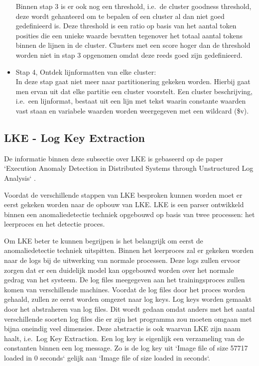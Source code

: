 \begin{itemize}
    Binnen stap 3 is er ook nog een threshold, i.e.\ de cluster goodness threshold, deze wordt gehanteerd om te bepalen of een cluster al dan niet goed gedefinieerd is. Deze threshold is een ratio op basis van het aantal token posities die een unieke waarde bevatten tegenover het totaal aantal tokens binnen de lijnen in de cluster. Clusters met een score hoger dan de threshold worden niet in stap 3 opgenomen omdat deze reeds goed zijn gedefinieerd.\\
    \item Stap 4, Ontdek lijnformatten van elke cluster:\\
    In deze stap gaat niet meer naar partitionering gekeken worden. Hierbij gaat men ervan uit dat elke partitie een cluster voorstelt. Een cluster beschrijving, i.e.\ een lijnformat, bestaat uit een lijn met tekst waarin constante waarden vast staan en variabele waarden worden weergegeven met een wildcard (\$v).
\end{itemize}

\subsection{LKE - Log Key Extraction}
De informatie binnen deze subsectie over LKE is gebaseerd op de paper `Execution Anomaly Detection in Distributed Systems through Unstructured Log Analysis` \autocite{fu2009execution}.

Voordat de verschillende stappen van LKE besproken kunnen worden moet er eerst gekeken worden naar de opbouw van LKE. LKE is een parser ontwikkeld binnen een anomaliedetectie techniek opgebouwd op basis van twee processen: het leerproces en het detectie proces. 

Om LKE beter te kunnen begrijpen is het belangrijk om eerst de anomaliedetectie techniek uitspitten. Binnen het leerproces zal er gekeken worden naar de logs bij de uitwerking van normale processen. Deze logs zullen ervoor zorgen dat er een duidelijk model kan opgebouwd worden over het normale gedrag van het systeem. De log files meegegeven aan het trainingsproces zullen komen van verschillende machines. Voordat de log files door het proces worden gehaald, zullen ze eerst worden omgezet naar log keys. Log keys worden gemaakt door het abstraheren van log files. Dit wordt gedaan omdat anders met het aantal verschillende soorten log files die er zijn het programma zou moeten omgaan met bijna oneindig veel dimensies. Deze abstractie is ook waarvan LKE zijn naam haalt, i.e.\ Log Key Extraction. Een log key is eigenlijk een verzameling van de constanten binnen een log message. Zo is de log key uit `Image file of size 57717 loaded in 0 seconds` gelijk aan `Image file of size loaded in seconds`. 

